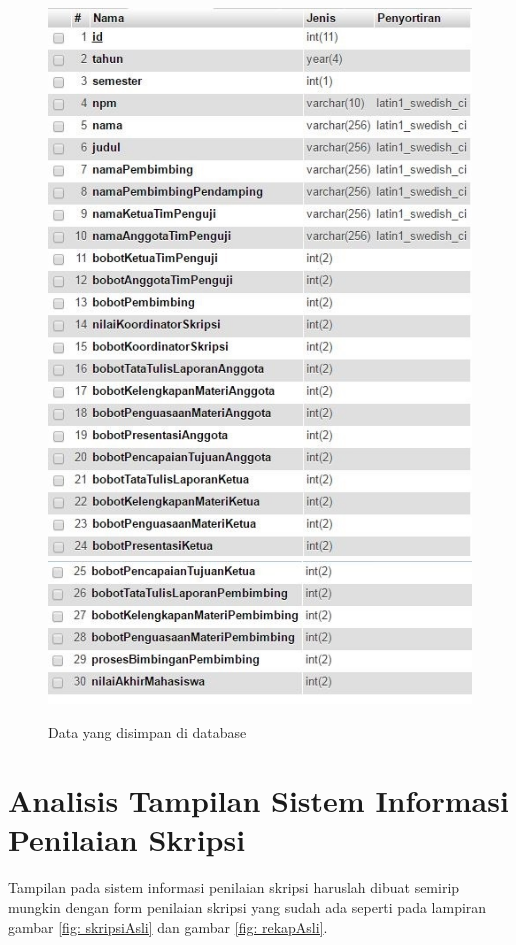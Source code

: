 		\begin{figure}[H]
			\centering
			\includegraphics[scale= 1.0]{Gambar/database1}
			\includegraphics[scale= 1.0]{Gambar/database2}
			\caption {Data yang disimpan di database}
			\label{fig:tabeldata}
		\end{figure}
	
\section{Analisis Tampilan Sistem Informasi Penilaian Skripsi}
\label{sec: analisisTampilan}
	
	Tampilan pada sistem informasi penilaian skripsi haruslah dibuat semirip mungkin dengan form penilaian skripsi yang sudah ada seperti pada lampiran gambar \ref{fig: skripsiAsli} dan gambar \ref{fig: rekapAsli}.
	
